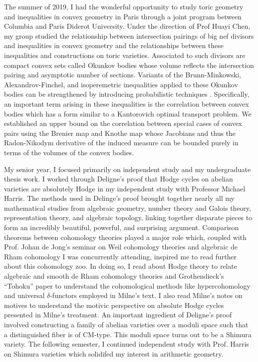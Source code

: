 \documentclass[11pt]{amsart}
\begin{document}
The summer of 2019, I had the wonderful opportunity to study toric geometry and inequalities in convex geometry in Paris through a joint program between Columbia and Paris Diderot University. Under the direction of Prof Huayi Chen, my group studied the relationship between intersection pairings of big nef divisors and inequalities in convex geometry and the relationships between these inequalities and constructions on toric varieties. Associated to such divisors are compact convex sets called Okunkov bodies whose volume reflects the intersection pairing and asymptotic number of sections. Variants of the Brunn-Minkowski, Alexandrov-Finchel, and isoperemetric inequalities applied to these Okunkov bodies can be strengthened by introducing probabilistic techniques \cite{probabiliste}. Specifically, an important term arising in these inequalities is the correlation between convex bodies which has a form similar to a Kantorovich optimal transport problem. We established an upper bound on the correlation between special cases of convex pairs using the Brenier map and Knothe map whose Jacobians and thus the Radon-Nikodym derivative of the induced measure can be bounded purely in terms of the volumes of the convex bodies.  
\par
My senior year, I focused primarily on independent study and my undergraduate thesis work. I worked through Deligne's proof that Hodge cycles on abelian varieties are absolutely Hodge in my independent study with Professor Michael Harris. The methods used in Delinge's proof brought together nearly all my mathematical studies from algebraic geometry, number theory and Galois theory, representation theory, and algebraic topology, linking together disparate pieces to form an incredibly beautiful, powerful, and surprising argument. 
Comparison theorems between cohomology theories played a major role which, coupled with Prof. Johan de Jong's seminar on Weil cohomology theories and algebraic de Rham cohomology I was concurrently attending, inspired me to read further about this cohomology zoo. In doing so, I read about Hodge theory to relate algebraic and smooth de Rham cohomology theories and Grothendieck's ``Tohoku'' paper to understand the cohomological methods like hypercohomology and universal $\delta$-functors employed in Milne's text. I also read Milne's notes on motives to understand the motivic perspective on absolute Hodge cycles presented in Milne's treatment. An important ingredient of Deligne's proof involved constructing a family of abelian varieties over a moduli space such that a distinguished fiber is of CM-type. This moduli space turns out to be a Shimura variety. The following semester, I continued independent study with Prof. Harris on Shimura varieties which solidifed my interest in arithmetic geometry. 
\end{document}
